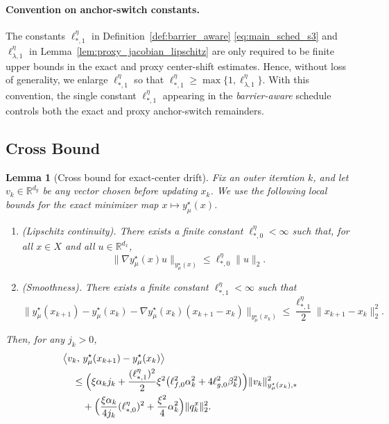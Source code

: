 \documentclass{article}
\newtheorem{lemma}{Lemma}
\begin{document}
\paragraph{Convention on anchor-switch constants.}
The constants \(\ell_{*,1}^{\eta}\)  in Definition~\ref{def:barrier_aware} \eqref{eq:main_sched_s3} and \(\ell_{\lambda,1}^{\eta}\) in Lemma~\ref{lem:proxy_jacobian_lipschitz} are only required to be finite
upper bounds in the exact and proxy center-shift estimates. Hence, without loss of generality, we
enlarge \(\ell_{*,1}^{\eta}\) so that \(\ell_{*,1}^{\eta}\ge \max\{1,\ell_{\lambda,1}^{\eta}\}.\) With this convention, the single constant \(\ell_{*,1}^{\eta}\) appearing in the \textit{barrier-aware} schedule
controls both the exact and proxy anchor-switch remainders.

\subsection{Cross Bound}

\begin{lemma}[Cross bound for exact-center drift]
\label{lem:exact_center_cross_bound}
Fix an outer iteration \(k\), and let \(v_k\in\mathbb R^{d_y}\) be any vector chosen before updating
\(x_k\). We use the following local bounds for the exact minimizer map
\(x\mapsto y_\mu^\star(x)\).

\begin{enumerate}
\item[\textup{(J0)}] \textup{(Lipschitz continuity).}
There exists a finite constant \(\ell_{*,0}^\eta<\infty\) such that, for all
\(x\in X\) and all \(u\in\mathbb R^{d_x}\),
\begin{equation}
\label{eq:exact_map_jacobian_bound}
\|\nabla y_\mu^\star(x)u\|_{y_\mu^\star(x)}
\le
\ell_{*,0}^\eta\|u\|_2 .
\end{equation}

\item[\textup{(J1)}] \textup{(Smoothness).}
There exists a finite constant \(\ell_{*,1}^\eta<\infty\) such that
\begin{equation}
\label{eq:exact_map_taylor_remainder}
\Big\|
y_\mu^\star(x_{k+1})-y_\mu^\star(x_k)
-\nabla y_\mu^\star(x_k)(x_{k+1}-x_k)
\Big\|_{y_\mu^\star(x_k)}
\le
\frac{\ell_{*,1}^\eta}{2}\|x_{k+1}-x_k\|_2^2 .
\end{equation}
\end{enumerate}

Then, for any \(j_k>0\),
\begin{align}
\label{eq:exact_center_cross_bound}
&\big\langle v_k,\,
y_\mu^\star(x_{k+1})-y_\mu^\star(x_k)
\big\rangle
\nonumber\\
&\quad\le
\Bigl(
\xi\alpha_k j_k
+
\frac{(\ell_{*,1}^\eta)^2}{2}\xi^2
\bigl(\ell_{f,0}^2\alpha_k^2+4\ell_{g,0}^2\beta_k^2\bigr)
\Bigr)
\|v_k\|_{y_\mu^\star(x_k),*}^2
\nonumber\\
&\qquad
+
\Bigl(
\frac{\xi\alpha_k}{4j_k}(\ell_{*,0}^\eta)^2
+
\frac{\xi^2}{4}\alpha_k^2
\Bigr)
\|q_k^x\|_2^2 .
\end{align}
\end{lemma}
\end{document}
